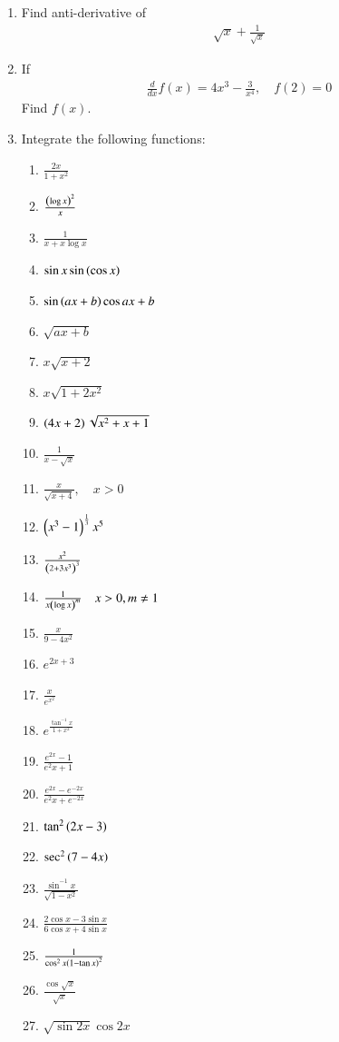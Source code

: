 \begin{enumerate}[label=\arabic*.,ref=\thesubsection.\theenumi]
\begin{enumerate}
\end{enumerate}
%
\item Find anti-derivative of 
%
\begin{align}
\sqrt{x} + \frac{1}{\sqrt{x}}
\end{align}
%
\item If 
%
\begin{align}
\frac{d}{dx}f(x) = 4x^3 - \frac{3}{x^4}, \quad f(2) = 0
\end{align}
%
Find $f(x)$.
%
%
\item Integrate the following functions:
\begin{enumerate}[label = (\roman*)]
\item $\frac{2x}{1+x^2}$
\item $\frac{\left(\log x\right)^2}{x}$
\item $\frac{1}{x+x\log x}$
\item $\sin x \sin\left(\cos x\right)$
\item $\sin \left(ax+b\right) \cos{a x + b}$
\item $\sqrt{ax+b}$
\item $x\sqrt{x+2}$
\item $x\sqrt{1+2x^2}$
\item $\left(4x+2\right)\sqrt{x^2+x+1}$
\item $\frac{1}{x-\sqrt{x}}$
\item $\frac{x}{\sqrt{x+4}}, \quad x > 0$
\item $\left(x^3-1\right)^{\frac{1}{3}}x^5$
\item $\frac{x^2}{\left(2+3x^3\right)^3}$
\item $\frac{1}{x\left(\log x\right)^m} \quad x > 0, m \ne 1$
\item $\frac{x}{9-4x^2}$
\item $e^{2x+3}$
\item $\frac{x}{e^{x^2}}$
\item $e^{\frac{\tan^{-1}x}{1+x^2}}$
\item $\frac{e^{2x}-1}{e^2x+1}$
\item $\frac{e^{2x}-e^{-2x}}{e^2x+e^{-2x}}$
\item $\tan^2\left(2x-3\right)$
\item $\sec^2\left(7-4x\right)$
\item $\frac{\sin^{-1}{x}}{\sqrt{1-x^2}}$
\item $\frac{2\cos x - 3\sin x}{6 \cos x + 4 \sin x}$
\item $\frac{1}{\cos^2 x\left(1-\tan x\right)^2}$
\item $\frac{\cos \sqrt{x}}{\sqrt{x}}$
\item $\sqrt{\sin 2x}\cos 2x$

\end{enumerate}
\end{enumerate}
